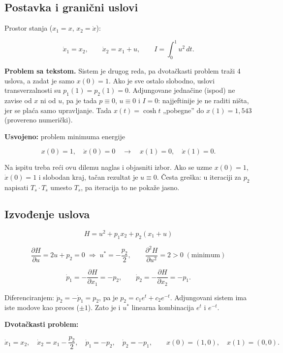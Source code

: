 \documentclass[11pt,a4paper,parskip=half,headsepline,numbers=noenddot]{scrartcl}
\begin{document}
\subsection{Postavka i granični uslovi}

Prostor stanja (\(x_1 = x\), \(x_2 = \dot x\)):

\[\dot x_1 = x_2, \qquad \dot x_2 = x_1 + u, \qquad I = \int_0^1 u^2\,dt .\]

\textbf{Problem sa tekstom.} Sistem je drugog reda, pa dvotačkasti problem traži 4 uslova, a zadat je samo \(x(0) = 1\). Ako je sve ostalo slobodno, uslovi transverzalnosti su \(p_1(1) = p_2(1) = 0\). Adjungovane jednačine (ispod) ne zavise od \(x\) ni od \(u\), pa je tada \(p \equiv 0\), \(u \equiv 0\) i \(I = 0\): najjeftinije je ne raditi ništa, jer se plaća samo upravljanje. Tada \(x(t) = \cosh t\) „pobegne'' do \(x(1) = 1{,}543\) (provereno numerički).

\textbf{Usvojeno:} problem minimuma energije

\[x(0) = 1, \quad \dot x(0) = 0 \quad\longrightarrow\quad x(1) = 0, \quad \dot x(1) = 0 .\]

Na ispitu treba reći ovu dilemu naglas i objasniti izbor. Ako se uzme \(x(0) = 1\), \(\dot x(0) = 1\) i slobodan kraj, tačan rezultat je \(u \equiv 0\). Česta greška: u iteraciji za \(p_2\) napisati \(T_s\cdot T_s\) umesto \(T_s\), pa iteracija to ne pokaže jasno.

\subsection{Izvođenje uslova}

\[H = u^2 + p_1x_2 + p_2(x_1 + u)\]

\[\frac{\partial H}{\partial u} = 2u + p_2 = 0 \;\Rightarrow\; u^* = -\frac{p_2}{2}, \qquad \frac{\partial^2H}{\partial u^2} = 2 > 0 \;(\text{minimum})\]

\[\dot p_1 = -\frac{\partial H}{\partial x_1} = -p_2, \qquad \dot p_2 = -\frac{\partial H}{\partial x_2} = -p_1 .\]

Diferenciranjem: \(\ddot p_2 = -\dot p_1 = p_2\), pa je \(p_2 = c_1e^t + c_2e^{-t}\). Adjungovani sistem ima iste modove kao proces (\(\pm1\)). Zato je i \(u^*\) linearna kombinacija \(e^t\) i \(e^{-t}\).

\textbf{Dvotačkasti problem:}

\[\dot x_1 = x_2, \quad \dot x_2 = x_1 - \frac{p_2}{2}, \quad \dot p_1 = -p_2, \quad \dot p_2 = -p_1, \qquad x(0) = (1, 0), \quad x(1) = (0, 0) .\]
\end{document}
